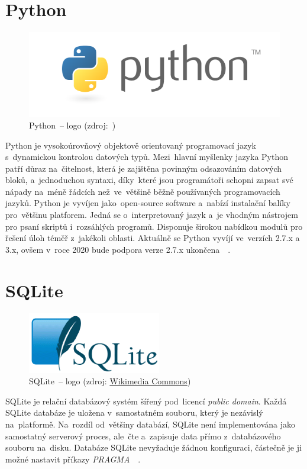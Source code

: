 \section{Python}
\label{python}

	\begin{figure}[H] \centering
		\includegraphics[width=.5\textwidth]{./pictures/python_logo.png}
      	\caption[Python~– logo]{Python~– logo (zdroj:~\citep{python})}
		\label{fig:python_logo}
 	\end{figure}

Python je vysokoúrovňový objektově orientovaný programovací jazyk
s~dynamickou kontrolou datových typů. Mezi~hlavní myšlenky jazyka
Python patří důraz na~čitelnost, která je zajištěna povinným
odsazováním datových bloků, a~jednoduchou syntaxi, díky~které jsou
programátoři schopni zapsat své nápady na~méně řádcích než~ve~většině
běžně používaných programovacích jazyků. Python je vyvíjen
jako~open-source software a~nabízí instalační balíky pro~většinu
platforem. Jedná se o~interpretovaný jazyk a~je vhodným nástrojem pro
psaní skriptů i~rozsáhlých programů. Disponuje širokou nabídkou modulů
pro řešení úloh téměř z~jakékoli oblasti. Aktuálně se Python vyvíjí
ve~verzích 2.7.x a 3.x, ovšem v~roce 2020 bude podpora verze 2.7.x
ukončena~\citep{python}~\citep{wiki_python}.

\section{SQLite}
\label{sqlite}

	\begin{figure}[H] \centering
		\includegraphics[width=.2\textwidth]{./pictures/sqlite_logo.png}
      	\caption[SQLite~– logo]{SQLite~– logo (zdroj:
\href{https://commons.wikimedia.org/wiki/File:SQLite_Logo_4.png}{Wikimedia
Commons})}
		\label{fig:sqlite_logo}
 	\end{figure}

SQLite je relační databázový systém šířený pod~licencí \textit{public
domain}. Každá SQLite databáze je uložena v~samostatném souboru, který
je nezávislý na~platformě. Na~rozdíl od~většiny databází, SQLite není
implementována jako samostatný serverový proces, ale~čte a~zapisuje
data přímo z~databázového souboru na~disku. Databáze SQLite nevyžaduje
žádnou konfiguraci, částečně je ji možné nastavit příkazy
\textit{PRAGMA}~\citep{sqlite}~\citep{wiki_sqlite}.

